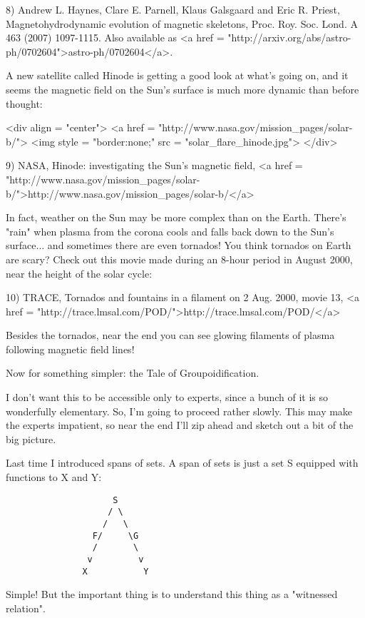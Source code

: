8) Andrew L. Haynes, Clare E. Parnell, Klaus Galsgaard and Eric R.
Priest, Magnetohydrodynamic evolution of magnetic skeletons, 
Proc. Roy. Soc. Lond. A 463 (2007) 1097-1115.  Also available as
<a href = "http://arxiv.org/abs/astro-ph/0702604">astro-ph/0702604</a>.

A new satellite called Hinode is getting a good look at what's going 
on, and it seems the magnetic field on the Sun's surface is much more 
dynamic than before thought:

<div align = "center">
<a href = "http://www.nasa.gov/mission_pages/solar-b/">
<img style = "border:none;" src = "solar_flare_hinode.jpg">
</div>

9) NASA, Hinode: investigating the Sun's magnetic field,
<a href = "http://www.nasa.gov/mission_pages/solar-b/">http://www.nasa.gov/mission_pages/solar-b/</a>

In fact, weather on the Sun may be more complex than on the Earth.  
There's "rain" when plasma from the corona cools and falls back down 
to the Sun's surface... and sometimes there are even tornados!  You 
think tornados on Earth are scary?  Check out this movie made during 
an 8-hour period in August 2000, near the height of the solar cycle:

10) TRACE, Tornados and fountains in a filament on 2 Aug. 2000, 
movie 13, <a href = "http://trace.lmsal.com/POD/">http://trace.lmsal.com/POD/</a>

Besides the tornados, near the end you can see glowing filaments of plasma
following magnetic field lines!

Now for something simpler: the Tale of Groupoidification.  

I don't want this to be accessible only to experts, since a bunch of
it is so wonderfully elementary.  So, I'm going to proceed rather slowly.  
This may make the experts impatient, so near the end I'll zip ahead and 
sketch out a bit of the big picture.  

Last time I introduced spans of sets.  A span of sets is just a set S 
equipped with functions to X and Y:

\begin{verbatim}
                     S
                    / \
                   /   \
                 F/     \G
                 /       \
                v         v 
               X           Y
\end{verbatim}
    
Simple!  But the important thing is to understand this thing as a
"witnessed relation".  

